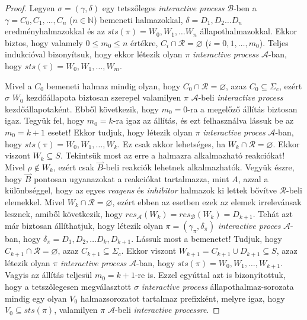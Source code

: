 \documentclass[12pt]{article}
\theoremstyle{definition}
\theoremstyle{remark}
\theoremstyle{plain}
\theoremstyle{plain}
\let\emptyset\varnothing
\newcommand{\forwardhat}{\overset{\rightharpoonup}}
\newcommand{\res}{\textit{res}}
\begin{document}
\begin{proof}
        Legyen $\sigma = (\gamma, \delta)$ egy tetszőleges \textit{interactive process} $\mathscr{B}$-ben a $\gamma = C_{0}, C_{1}, \ldots, C_{n}$ ($n \in \mathbb{N}$) bemeneti halmazokkal, $\delta = D_{1}, D_{2} \ldots D_{n}$ eredményhalmazokkal és az $\textit{sts}(\pi)=W_{0},W_{1},\ldots W_{n}$ állapothalmazokkal. Ekkor biztos, hogy valamely $0 \leq m_{0} \leq n$ értékre, $C_{i} \cap \mathcal{R} = \emptyset$ ($i = 0, 1, \ldots, m_{0}$). Teljes indukcióval bizonyítsuk, hogy ekkor létezik olyan $\pi$ \textit{interactive process} $\mathscr{A}$-ban, hogy $\textit{sts}(\pi) = W_{0}, W_{1}, \ldots, W_{m}$.
        
        Mivel a $C_{0}$ bemeneti halmaz mindig olyan, hogy $C_{0} \cap \mathcal{R} = \emptyset$, azaz $C_{0} \subseteq \Sigma_{c}$, ezért $\sigma$ $W_{0}$ kezdőállapota biztosan szerepel valamilyen $\pi$ $\mathscr{A}$-beli \textit{interactive process} kezdőállapotaként. Ebből következik, hogy $m_{0} = 0$-ra a megelőző állítás biztosan igaz. Tegyük fel, hogy $m_{0} = k$-ra igaz az állítás, és ezt felhasználva lássuk be az $m_{0} = k + 1$ esetet! Ekkor tudjuk, hogy létezik olyan $\pi$ \textit{interactive proces} $\mathscr{A}$-ban, hogy $\textit{sts}(\pi) = W_{0}, W_{1}, \ldots, W_{k}$. Ez csak akkor lehetséges, ha $W_{k} \cap \mathcal{R} = \emptyset$. Ekkor viszont $W_{k} \subseteq S$. Tekintsük most az erre a halmazra alkalmazható reakciókat! Mivel $\rho \notin W_{k}$, ezért csak $\forwardhat B$-beli reakciók lehetnek alkalmazhatók. Vegyük észre, hogy $\forwardhat B$ pontosan ugyanazokat a reakciókat tartalmazza, mint $A$, azzal a különbséggel, hogy az egyes \textit{reagens} és \textit{inhibitor} halmazok ki lettek bővítve $\mathcal{R}$-beli elemekkel. Mivel $W_{k} \cap \mathcal{R} = \emptyset$, ezért ebben az esetben ezek az elemek irrelevánsak lesznek, amiből következik, hogy $\res_{\mathscr{A}}(W_{k}) = \res_{\mathscr{B}}(W_{k}) = D_{k + 1}$. Tehát azt már biztosan állíthatjuk, hogy létezik olyan $\pi = (\gamma_{\pi}, \delta_{\pi})$ \textit{interactive proces} $\mathscr{A}$-ban, hogy $\delta_{\pi} = D_{1}, D_{2}, \ldots D_{k}, D_{k + 1}$. Lássuk most a bemenetet! Tudjuk, hogy $C_{k + 1} \cap \mathcal{R} = \emptyset$, azaz $C_{k + 1} \subseteq \Sigma_{c}$. Ekkor viszont $W_{k + 1} = C_{k + 1} \cup D_{k + 1} \subseteq S$, azaz létezik olyan $\pi$ \textit{interactive process} $\mathscr{A}$-ban, hogy $\textit{sts}(\pi)=W_{0}, W_{1}, \ldots, W_{k + 1}$. Vagyis az állítás teljesül $m_{0} = k + 1$-re is.  Ezzel egyúttal azt is bizonyítottuk, hogy a tetszőlegesen megválasztott $\sigma$ \textit{interactive process} állapothalmaz-sorozata mindig egy olyan $V_{0}$ halmazsorozatot tartalmaz prefixként, melyre igaz, hogy $V_{0} \subseteq \textit{sts}(\pi)$, valamilyen $\pi$ $\mathscr{A}$-beli \textit{interactive processre}.
        

\end{proof}
\end{document}
